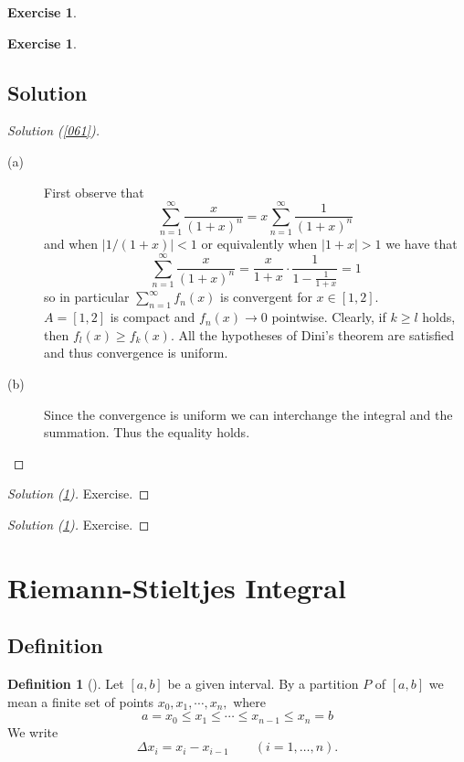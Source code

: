 \documentclass[	DIV=calc,paper=a4,fontsize=11pt]{scrartcl}	 	%
\theoremstyle{definition}
\newtheorem{defn}[thm]{Definition}
\newtheorem{exer}[thm]{Exercise}
\theoremstyle{plain}
\theoremstyle{remark}
\begin{document}
\begin{exer}\label{062}
\end{exer}

\begin{exer}\label{063}
\end{exer}

\newpage
\subsection*{Solution}
\begin{proof}[Solution (\ref{061})]
\begin{description}
  \item[(a)] First observe that
  \[\sum_{n=1}^{\infty} \frac{x}{(1 + x)^n} = x\sum_{n=1}^{\infty}\frac{1}{(1 + x)^n}\]
  and when $|1/(1 + x)| < 1$ or equivalently when $|1 + x| > 1$ we have that
  \[\sum_{n=1}^{\infty}\frac{x}{(1 + x)^n} =\frac{x}{1 + x}\cdot\frac{1}{1- \frac{1}{1+x}}= 1\]
  so in particular $\sum_{n=1}^{\infty}f_n(x)$ is convergent for $x\in [1, 2]$.\\
  $A = [1, 2]$ is compact and $f_n(x)\to 0$ pointwise. Clearly, if $k \geq l$ holds, then $f_l(x) \geq f_k(x)$.
  All the hypotheses of Dini's theorem are satisfied and thus convergence is uniform.
  \item[(b)] Since the convergence is uniform we can interchange the integral and the summation. Thus the equality holds.
\end{description}
\end{proof}
\begin{proof}[Solution (\ref{062})]
Exercise.
\end{proof}
\begin{proof}[Solution (\ref{063})]
Exercise.
\end{proof}

\newpage
\section{Riemann-Stieltjes Integral}

\subsection{Definition}

\begin{defn}[\textbf{\color{blue}{Partition}}]
Let $[a, b]$ be a given interval. By a partition $P$ of $[a, b]$ we mean a finite set of points $x_0, x_1,\cdots ,x_n,$ where
$$a=x_0\leq x_1\leq \cdots \leq x_{n-1}\leq x_n=b$$
We write
$$\Delta x_i= x_i-x_{i-1}\qquad (i = 1 ,\ldots ,n).$$
\end{defn}
\end{document}
